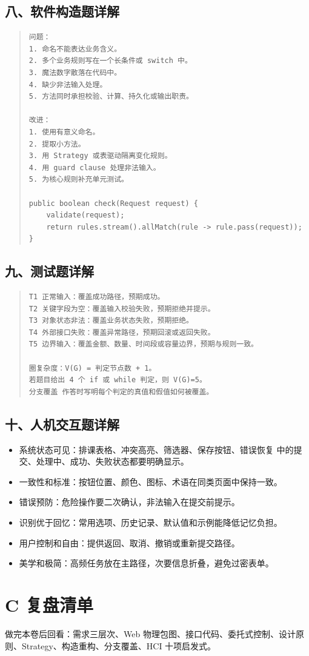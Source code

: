 \documentclass[UTF8,zihao=-4]{ctexart}
\begin{document}
\subsection{八、软件构造题详解}


\begin{quote}
\footnotesize
\begin{verbatim}
问题：
1. 命名不能表达业务含义。
2. 多个业务规则写在一个长条件或 switch 中。
3. 魔法数字散落在代码中。
4. 缺少非法输入处理。
5. 方法同时承担校验、计算、持久化或输出职责。

改进：
1. 使用有意义命名。
2. 提取小方法。
3. 用 Strategy 或表驱动隔离变化规则。
4. 用 guard clause 处理非法输入。
5. 为核心规则补充单元测试。

public boolean check(Request request) {
    validate(request);
    return rules.stream().allMatch(rule -> rule.pass(request));
}
\end{verbatim}
\end{quote}



\subsection{九、测试题详解}


\begin{quote}
\footnotesize
\begin{verbatim}
T1 正常输入：覆盖成功路径，预期成功。
T2 关键字段为空：覆盖输入校验失败，预期拒绝并提示。
T3 对象状态非法：覆盖业务状态失败，预期拒绝。
T4 外部接口失败：覆盖异常路径，预期回滚或返回失败。
T5 边界输入：覆盖金额、数量、时间段或容量边界，预期与规则一致。

圈复杂度：V(G) = 判定节点数 + 1。
若题目给出 4 个 if 或 while 判定，则 V(G)=5。
分支覆盖 作答时写明每个判定的真值和假值如何被覆盖。
\end{verbatim}
\end{quote}



\subsection{十、人机交互题详解}


\begin{itemize}
\item 系统状态可见：排课表格、冲突高亮、筛选器、保存按钮、错误恢复 中的提交、处理中、成功、失败状态都要明确显示。
\item 一致性和标准：按钮位置、颜色、图标、术语在同类页面中保持一致。
\item 错误预防：危险操作要二次确认，非法输入在提交前提示。
\item 识别优于回忆：常用选项、历史记录、默认值和示例能降低记忆负担。
\item 用户控制和自由：提供返回、取消、撤销或重新提交路径。
\item 美学和极简：高频任务放在主路径，次要信息折叠，避免过密表单。
\end{itemize}



\section{C 复盘清单}


做完本卷后回看：需求三层次、Web 物理包图、接口代码、委托式控制、设计原则、Strategy、构造重构、分支覆盖、HCI 十项启发式。
\end{document}
